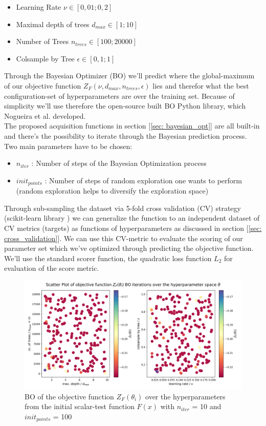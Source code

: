 \documentclass[12pt, a4paper]{article}
\begin{document}
\begin{itemize}
    \item Learning Rate $\nu \in  [0{,}01 ; 0{,}2]$
    \item Maximal depth of trees $d_{max} \in [1; 10]$
    \item Number of Trees $n_{trees} \in [100; 20000]$
    \item Colsample by Tree $\epsilon \in [0{,}1; 1]$
\end{itemize}
Through the Bayesian Optimizer (BO) we'll predict where the global-maximum of our objective function $Z_F(\nu,d_{max},n_{trees},\epsilon)$ lies and therefor what the best configuration-set of hyperparameters are over the training set. Because of simplicity we'll use therefore the open-source built BO Python library, which Nogueira et al. \cite{Nogueira2014} developed. \\
The proposed acquisition functions in section [\ref{sec: bayesian_opt}] are all built-in and there's the possibility to iterate through the Bayesian prediction process. Two main parameters have to be chosen:
\begin{itemize}
    \item $n_{iter}$ : Number of steps of the Bayesian Optimization process
    \item $init_{points}$ : Number of steps of random exploration one wants to perform (random exploration helps to diversify the exploration space)
\end{itemize}
Through sub-sampling the dataset via 5-fold cross validation (CV) strategy (scikit-learn library \cite{Scikit2023}) we can generalize the function to an independent dataset of CV metrics (targets) as functions of hyperparameters as discussed in section [\ref{sec: cross_validation}]. We can use this CV-metric to evaluate the scoring of our parameter set which we've optimized through predicting the objective function. We'll use the standard scorer function, the quadratic loss function $L_2$ for evaluation of the score metric.
\begin{figure}[!htpb]
    \centering
    \includegraphics[width=1\textwidth,trim={0 0 0 0},clip]{figures/gbm_with_decision_tree_hyperparameters_scatter_plot.png}
    \caption[Bayesian Optimizations iterations]{BO of the objective function $Z_F(\theta_i)$ over the hyperparameters from the initial scalar-test function $F(x)$ with $n_{iter}$ = 10 and $init_{points}$ = 100}
    \label{fig: gbm_dt_scatter_plot}
\end{figure}
\end{document}
